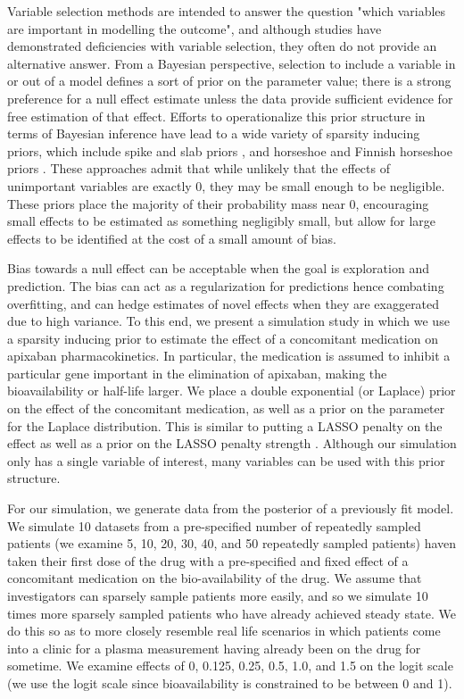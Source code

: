 Variable selection methods are intended to answer the question "which variables are important in modelling the outcome", and although studies have demonstrated deficiencies with variable selection, they often do not provide an alternative answer.  From a Bayesian perspective, selection to include a variable in or out of a model defines a sort of prior on the parameter value; there is a strong preference for a null effect estimate unless the data provide sufficient evidence for free estimation of that effect.  Efforts to operationalize this prior structure in terms of Bayesian inference have lead to a wide variety of sparsity inducing priors, which include spike and slab priors \cite{mitchell1988bayesian}, and horseshoe \cite{carvalho2010horseshoe} and Finnish horseshoe priors \cite{piironen2017sparsity}. These approaches admit that while unlikely that the effects of unimportant variables are exactly 0, they may be small enough to be negligible.  These priors place the majority of their probability mass near 0, encouraging small effects to be estimated as something negligibly small, but allow for large effects to be identified at the cost of a small amount of bias.

Bias towards a null effect  can be acceptable when the goal is exploration and prediction.  The bias can act as a regularization for predictions hence combating overfitting, and can hedge estimates of novel effects when they are exaggerated due to high variance. To this end, we present a simulation study in which we use a sparsity inducing prior to estimate the effect of a concomitant medication on apixaban pharmacokinetics.  In particular, the medication is assumed to inhibit a particular gene important in the elimination of apixaban, making the bioavailability or half-life larger.  We place a double exponential (or Laplace) prior on the effect of the concomitant medication, as well as a prior on the parameter for the Laplace distribution.  This is similar to putting a LASSO penalty on the effect as well as a prior on the LASSO penalty strength \cite{tibshirani1996regression}.  Although our simulation only has a single variable of interest, many variables can be used with this prior structure.

For our simulation, we generate data from the posterior of a previously fit model. We simulate 10 datasets from a pre-specified number of repeatedly sampled patients (we examine 5, 10, 20, 30, 40, and 50 repeatedly sampled patients) haven taken their first dose of the drug with a pre-specified and fixed effect of a concomitant medication on the bio-availability of the drug.  We assume that investigators can sparsely sample patients more easily, and so we simulate 10 times more sparsely sampled patients who have already achieved steady state. We do this so as to more closely resemble real life scenarios in which patients come into a clinic for a plasma measurement having already been on the drug for sometime. We examine effects of 0, 0.125, 0.25, 0.5, 1.0, and 1.5 on the logit scale (we use the logit scale since bioavailability is constrained to be between 0 and 1). 

